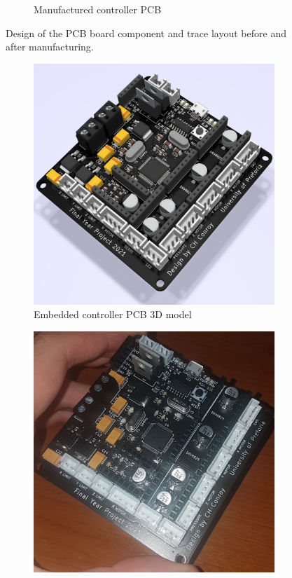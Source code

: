 \begin{figure}[!ht]
\begin{subfigure}{.5\textwidth}
		\caption{Manufactured controller PCB}
		\label{fig:empty-robotic-controller}
	\end{subfigure}%
	\caption{Design of the PCB board component and trace layout before and after manufacturing.}
	\label{fig:pcb-design-process}
\end{figure}

\begin{figure}[!ht]
	\centering
	\begin{subfigure}{.5\textwidth}
		\centering
		\includegraphics[width=1\linewidth]{figures/robotic-controller-model.png}
		\caption{Embedded controller PCB 3D model}
	\label{fig:robotic-controller-model}
	\end{subfigure}%
	\begin{subfigure}{.5\textwidth}
		\centering
		\includegraphics[width=1\linewidth]{figures/final-pcb.jpg}

\end{subfigure}
\end{figure}
